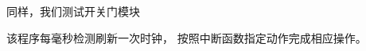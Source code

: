 \documentclass[../main.tex]{subfiles} %
\begin{document}
同样，我们测试开关门模块


该程序每毫秒检测刷新一次时钟，
按照中断函数指定动作完成相应操作。
\end{document}
